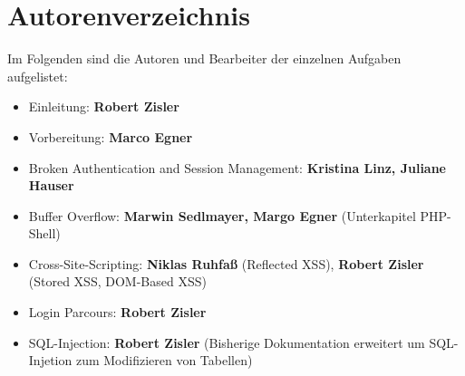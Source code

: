 \chapter{Autorenverzeichnis}
Im Folgenden sind die Autoren und Bearbeiter der einzelnen Aufgaben aufgelistet: 
\begin{itemize}
\item Einleitung: \textbf{Robert Zisler}
\item Vorbereitung: \textbf{Marco Egner}
\item Broken Authentication and Session Management: \textbf{Kristina Linz, Juliane Hauser}
\item Buffer Overflow: \textbf{Marwin Sedlmayer, Margo Egner} (Unterkapitel PHP-Shell)
\item Cross-Site-Scripting: \textbf{Niklas Ruhfaß} (Reflected XSS), \textbf{Robert Zisler} (Stored XSS, DOM-Based XSS)
\item Login Parcours: \textbf{Robert Zisler}
\item SQL-Injection: \textbf{Robert Zisler} (Bisherige Dokumentation erweitert um SQL-Injetion zum Modifizieren von Tabellen) 
\end{itemize}